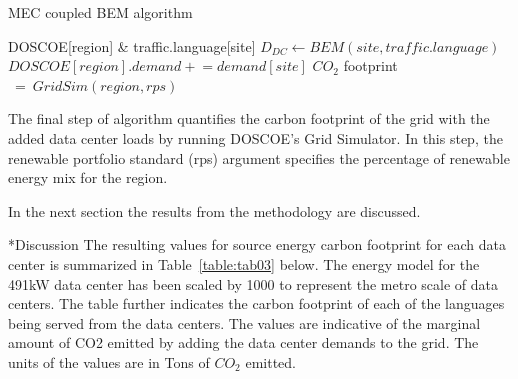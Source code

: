 \documentclass[twocolumn, a4paper,10pt]{article}
\makeatletter
\newcommand{\pluseq}{\mathrel{+}=}
\renewcommand\section{\@startsection{section}{1}{\z@}{3pt}{3pt}{\normalfont\large\bfseries}}
\makeatother
\begin{document}
  \begin{algorithm}
    \begin{small}
    \caption{MEC coupled BEM algorithm}
    \begin{algorithmic}
      \REQUIRE DOSCOE[region] \& traffic.language[site]
        \STATE $D_{DC} \gets BEM(site, traffic.language)$
        \STATE $DOSCOE[region].demand \pluseq demand[site]$
        \ENDIF
      \ENDFOR
      \STATE $CO_{2}$ {footprint}$\ =\ GridSim(region, rps)$
    \end{algorithmic}
    \label{Service Profile}
  \end{small}
  \end{algorithm}

  The final step of algorithm quantifies the carbon footprint of the grid with the added data center loads by running DOSCOE’s Grid Simulator. In this step, the renewable portfolio standard (rps) argument specifies the percentage of renewable energy mix for the region.  

  In the next section the results from the methodology are discussed. 



\section*{Discussion}
The resulting values for source energy carbon footprint for each data center is summarized in Table~\ref{table:tab03} below. The energy model for the 491kW data center has been scaled by 1000 to represent the metro scale of data centers. The table further indicates the carbon footprint of each of the languages being served from the data centers. The values are indicative of the marginal amount of CO2 emitted by adding the data center demands to the grid. The units of the values are in Tons of $CO_2$ emitted.
\end{document}
